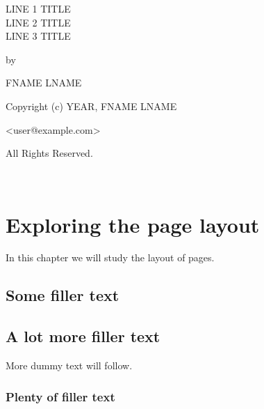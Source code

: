 \documentclass[11pt]{book}
\makeatletter
\newlength{\tpheight}\setlength{\tpheight}{0.9\textheight}
\newlength{\txtheight}\setlength{\txtheight}{0.9\tpheight}
\newlength{\drop}
\newcommand*{\titlePAGE}{\begingroup%
 \ttfamily
 \drop=0.1\txtheight
 \vspace*{\drop}
 \centering
 {\Large%
 LINE 1 TITLE \\ LINE 2 TITLE \\ LINE 3 TITLE\par}
 	\vspace*{\drop}
 	{\large by}\par
 	\vspace*{\drop}
 	{\Large FNAME LNAME}\par
 	\vfill
 	\raggedright
 	{\Large
 	  Copyright (c) YEAR, FNAME LNAME\par
 	  <user@example.com>\par
 	  All Rights Reserved.\par}
 		  \vfill
 		  \null
		  \endgroup}
\makeatother
\begin{document}
\titlePAGE
\newpage
\thispagestyle{empty}
\mbox{ }
\chapter{Exploring the page layout}
In this chapter we will study the layout of pages.
\section{Some filler text}
\blindtext
\section{A lot more filler text}
More dummy text will follow.
\subsection{Plenty of filler text}
\blindtext[10]
\newpage
\thispagestyle{empty}
\mbox{}
\newpage
\thispagestyle{empty}
\mbox{}
\end{document}
